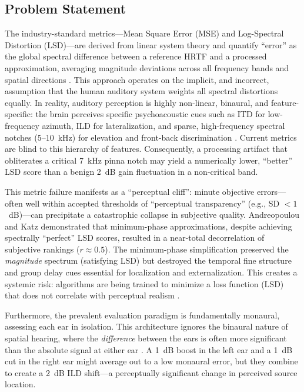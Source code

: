 \documentclass[12pt,a4paper]{article}
\begin{document}
\subsection{Problem Statement}

The industry-standard metrics---Mean Square Error (MSE) and Log-Spectral Distortion (LSD)---are derived from linear system theory and quantify ``error'' as the global spectral difference between a reference HRTF and a processed approximation, averaging magnitude deviations across all frequency bands and spatial directions \cite{andreopoulou2022}. This approach operates on the implicit, and incorrect, assumption that the human auditory system weights all spectral distortions equally. In reality, auditory perception is highly non-linear, binaural, and feature-specific: the brain perceives specific psychoacoustic cues such as ITD for low-frequency azimuth, ILD for lateralization, and sparse, high-frequency spectral notches (5--10~kHz) for elevation and front-back discrimination \cite{asaudio2025}. Current metrics are blind to this hierarchy of features. Consequently, a processing artifact that obliterates a critical 7~kHz pinna notch may yield a numerically lower, ``better'' LSD score than a benign 2~dB gain fluctuation in a non-critical band.

This metric failure manifests as a ``perceptual cliff'': minute objective errors---often well within accepted thresholds of ``perceptual transparency'' (e.g., SD $< 1$~dB)---can precipitate a catastrophic collapse in subjective quality. Andreopoulou and Katz \cite{andreopoulou2022} demonstrated that minimum-phase approximations, despite achieving spectrally ``perfect'' LSD scores, resulted in a near-total decorrelation of subjective rankings ($r \approx 0.5$). The minimum-phase simplification preserved the \textit{magnitude} spectrum (satisfying LSD) but destroyed the temporal fine structure and group delay cues essential for localization and externalization. This creates a systemic risk: algorithms are being trained to minimize a loss function (LSD) that does not correlate with perceptual realism \cite{itd_loss2024}.

Furthermore, the prevalent evaluation paradigm is fundamentally monaural, assessing each ear in isolation. This architecture ignores the binaural nature of spatial hearing, where the \textit{difference} between the ears is often more significant than the absolute signal at either ear \cite{andreopoulou_icmc2014}. A 1~dB boost in the left ear and a 1~dB cut in the right ear might average out to a low monaural error, but they combine to create a 2~dB ILD shift---a perceptually significant change in perceived source location.
\end{document}
